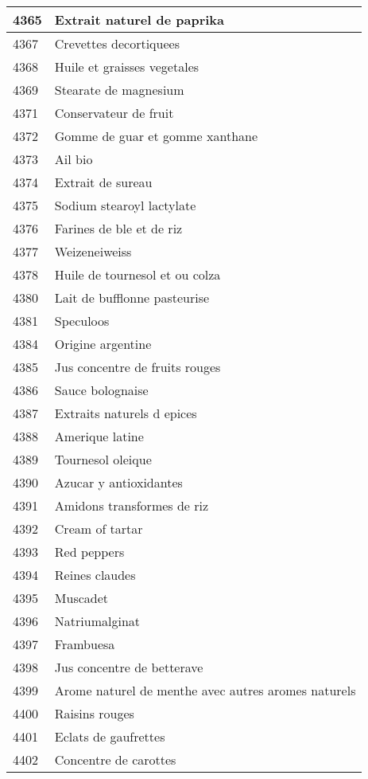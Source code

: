 \begin{longtable}{|l|l|}
4365 & Extrait naturel de paprika \\ \hline 
4367 & Crevettes decortiquees \\ \hline 
4368 & Huile et graisses vegetales \\ \hline 
4369 & Stearate de magnesium \\ \hline 
4371 & Conservateur de fruit \\ \hline 
4372 & Gomme de guar et gomme xanthane \\ \hline 
4373 & Ail bio \\ \hline 
4374 & Extrait de sureau \\ \hline 
4375 & Sodium stearoyl lactylate \\ \hline 
4376 & Farines de ble et de riz \\ \hline 
4377 & Weizeneiweiss \\ \hline 
4378 & Huile de tournesol et ou colza \\ \hline 
4380 & Lait de bufflonne pasteurise \\ \hline 
4381 & Speculoos \\ \hline 
4384 & Origine argentine \\ \hline 
4385 & Jus concentre de fruits rouges \\ \hline 
4386 & Sauce bolognaise \\ \hline 
4387 & Extraits naturels d epices \\ \hline 
4388 & Amerique latine \\ \hline 
4389 & Tournesol oleique \\ \hline 
4390 & Azucar y antioxidantes \\ \hline 
4391 & Amidons transformes de riz \\ \hline 
4392 & Cream of tartar \\ \hline 
4393 & Red peppers \\ \hline 
4394 & Reines claudes \\ \hline 
4395 & Muscadet \\ \hline 
4396 & Natriumalginat \\ \hline 
4397 & Frambuesa \\ \hline 
4398 & Jus concentre de betterave \\ \hline 
4399 & Arome naturel de menthe avec autres aromes naturels \\ \hline 
4400 & Raisins rouges \\ \hline 
4401 & Eclats de gaufrettes \\ \hline 
4402 & Concentre de carottes \\ \hline 

\end{longtable}
